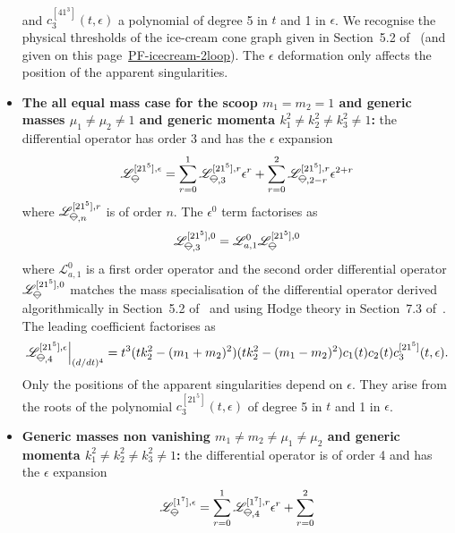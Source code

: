 \documentclass[a4paper,12pt]{article}
\numberwithin{equation}{section}
\numberwithin{figure}{section}
\newcommand{\IceCream}{	\begin{tikzpicture}[scale=0.05]
	\draw[color = black, fill=none] (2,0) arc(0:180:2);
		\draw [black] (-2,0) to (2,0);
		\draw [black] (-2,0) to (0,-2);
                	\draw [black] (2,0) to (0,-2);
	\end{tikzpicture}}
\begin{document}
\begin{itemize}
\begin{multline}
	\end{multline}
	and $c^{[41^3]}_3(t,\epsilon)$ a polynomial of  degree 5 in $t$ and 1 in
	$\epsilon$. We recognise the physical thresholds of the ice-cream
	cone graph given in Section~5.2 of~\cite{Lairez:2022zkj} (and given
	on this
	page~\href{https://nbviewer.org/github/pierrevanhove/PicardFuchs/blob/main/PF-icecream-2loop.ipynb}{PF-icecream-2loop}). The
	$\epsilon$ deformation only affects the position of the apparent singularities. 
	\item \textbf{The all equal mass case for the scoop
		$m_1=m_2=1$ and generic masses $\mu_1\neq\mu_2\neq1$ and generic
		momenta  $k_1^2\neq k_2^2\neq
		k_3^2\neq 1$:}  the differential operator has order 3 and has the
	$\epsilon$ expansion
	\begin{equation}
		\mathscr{L}_{\IceCream}^{[21^5],\epsilon}=\sum_{r=0}^1
		\mathscr{L}_{\IceCream,3}^{[21^5],r} \epsilon^r+ \sum_{r=0}^2   \mathscr{L}_{\IceCream,2-r}^{[21^5],r} \epsilon^{2+r}
	\end{equation}
	where $ \mathscr{L}_{\IceCream,n}^{[21^5],r}$  is of order $n$. The
	$\epsilon^0$ term factorises as
	\begin{equation}
		\mathscr{L}_{\IceCream,3}^{[21^5],0}=\mathscr{L}_{a,1}^0 \mathscr{L}_{\IceCream}^{[21^5] ,0      }
	\end{equation}
	where $\mathscr{L}_{a,1}^0$ is a first order operator and the second order
	differential operator  $\mathscr{L}_{\IceCream}^{[21^5] ,0}
	$ matches the mass specialisation of the differential
	operator derived algorithmically in Section~5.2
	of~\cite{Lairez:2022zkj} and using Hodge theory in
	Section~7.3 of~\cite{Doran:2023yzu}.
	The leading coefficient factorises as
	\begin{equation}
		\mathscr{L}_{\IceCream,4}^{[21^5],\epsilon}\Big|_{(d/dt)^4}=t^3
		(tk_2^2-(m_1+m_2)^2)(tk_2^2-(m_1-m_2)^2) c_1(t)
		c_2(t) c^{[21^5]}_3(t,\epsilon)   .
	\end{equation}
	Only the positions of the apparent singularities 
	 depend on $\epsilon$. They arise from the
	roots of the polynomial $c^{[21^5]}_3(t,\epsilon)   $ of
	degree 5 in $t$ and 1 in $\epsilon$.
	\item \textbf{Generic masses non vanishing
		$m_1\neq m_2\neq\mu_1\neq\mu_2$ and generic
		momenta  $k_1^2\neq k_2^2\neq
		k_3^2\neq 1$:}  the differential operator is of order 4 and has the
	$\epsilon$ expansion
	\begin{equation}
		\mathscr{L}_{\IceCream}^{[1^7],\epsilon}=\sum_{r=0}^1
		\mathscr{L}_{\IceCream,4}^{[1^7],r} \epsilon^r+ \sum_{r=0}^2

\end{equation}
\end{itemize}
\end{document}
